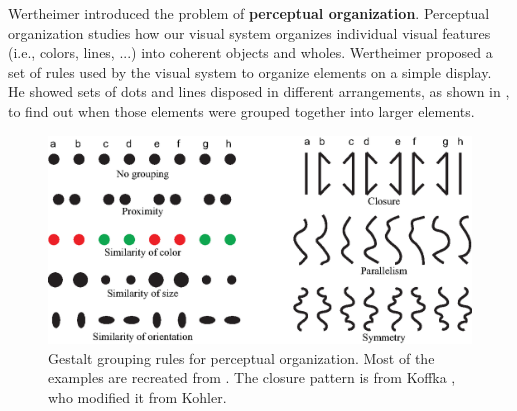 Wertheimer introduced the problem of {\bf perceptual organization}.
Perceptual organization studies how our visual system organizes individual visual features (i.e., colors, lines, ...) into coherent objects and wholes. Wertheimer proposed a set of rules
used by the visual system to organize elements on a simple display. He showed sets of dots and lines disposed in different arrangements, as shown in \fig{\ref{fig:gestalt}}, to find out when those elements were grouped together into larger elements.


\begin{figure}[t]
    \centerline{
        \includegraphics[width=1\linewidth]{figures/taxonomy/gestalt.eps}
    }
    \caption{Gestalt grouping rules for perceptual organization. Most of the examples are recreated from \cite{Palmer1999}. The closure pattern is from Koffka \cite{Koffka1935}, who modified it from Kohler.}
    \label{fig:gestalt}
\end{figure}

